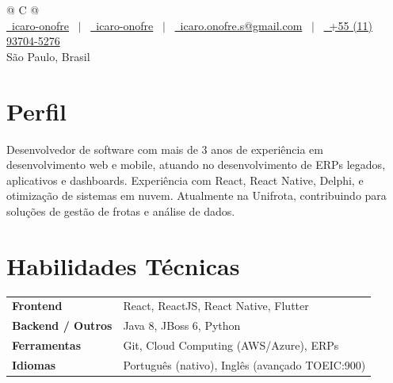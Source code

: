 \documentclass[a4paper,11pt]{article}
\begin{document}
\pagestyle{empty}

\begin{tabularx}{\linewidth}{@{} C @{}}
\fontsize{32}{38} \\[6pt]
\small
\href{https://github.com/icaro-onofre}{\raisebox{-0.05\height}\faGithub\ icaro-onofre} \
$|$ \
\href{https://linkedin.com/in/icaro-onofre}{\raisebox{-0.05\height}\faLinkedin\ icaro-onofre} \
$|$ \
\href{mailto:icaro.onofre.s@gmail.com}{\raisebox{-0.05\height}\faEnvelope\ icaro.onofre.s@gmail.com} \
$|$ \
\href{tel:+5511937045276}{\raisebox{-0.05\height}\faMobile\ +55 (11) 93704-5276} \\[4pt]
\small\color{medgray} São Paulo, Brasil
\end{tabularx}

\vspace{4pt}

\section{Perfil}

Desenvolvedor de software com mais de 3 anos de experiência em desenvolvimento web e mobile, atuando no desenvolvimento de ERPs legados, aplicativos e dashboards. Experiência com React, React Native, Delphi, e otimização de sistemas em nuvem. Atualmente na Unifrota, contribuindo para soluções de gestão de frotas e análise de dados.

\section{Habilidades Técnicas}

\begin{tabularx}{\linewidth}{@{}l X@{}}
\textbf{Frontend} & React, ReactJS, React Native, Flutter \\[3pt]
\textbf{Backend / Outros} & Java 8, JBoss 6, Python \\[3pt]
\textbf{Ferramentas} & Git, Cloud Computing (AWS/Azure), ERPs \\[3pt]
\textbf{Idiomas} & Português (nativo), Inglês (avançado TOEIC:900) \\
\end{tabularx}
\end{document}
